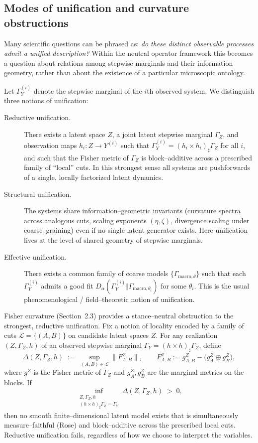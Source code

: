 \documentclass[11pt]{article}
\newcommand{\1}{\mathbf{1}}
\begin{document}
\subsection{Modes of unification and curvature obstructions}

Many scientific questions can be phrased as: \emph{do these distinct observable processes admit a unified description?} Within the neutral operator framework this becomes a question about relations among stepwise marginals and their information geometry, rather than about the existence of a particular microscopic ontology.

Let \(\Gamma_Y^{(i)}\) denote the stepwise marginal of the \(i\)th observed system. We distinguish three notions of unification:

\begin{description}
  \item[Reductive unification.]
    There exists a latent space \(Z\), a joint latent stepwise marginal \(\Gamma_Z\), and observation
    maps \(h_i : Z \to Y^{(i)}\) such that
    \(\Gamma_Y^{(i)} = (h_i \times h_i)_\sharp \Gamma_Z\) for all \(i\), and such that the Fisher
    metric of \(\Gamma_Z\) is block–additive across a prescribed family of ``local'' cuts. In this
    strongest sense all systems are pushforwards of a single, locally factorized latent dynamics.

  \item[Structural unification.]
    The systems share information–geometric invariants (curvature spectra across analogous cuts,
    scaling exponents \((\eta,\zeta)\), divergence scaling under coarse–graining) even if no single
    latent generator exists. Here unification lives at the level of shared geometry of stepwise
    marginals.

  \item[Effective unification.]
    There exists a common family of coarse models \(\{\Gamma_{\mathrm{macro},\theta}\}\) such that each
    \(\Gamma_Y^{(i)}\) admits a good fit \(D_\alpha(\Gamma_Y^{(i)} \Vert
    \Gamma_{\mathrm{macro},\theta_i})\) for some \(\theta_i\). This is the usual phenomenological /
    field–theoretic notion of unification.
\end{description}

Fisher curvature (Section~2.3) provides a stance–neutral obstruction to the strongest, reductive unification. Fix a notion of locality encoded by a family of cuts
\(\mathcal{L} = \{(A,B)\}\) on candidate latent spaces \(Z\). For any realization
\((Z,\Gamma_Z,h)\) of an observed stepwise marginal \(\Gamma_Y = (h \times h)_\sharp \Gamma_Z\), define
\[
  \Delta(Z,\Gamma_Z,h)
  \;:=\;
  \sup_{(A,B) \in \mathcal{L}} \bigl\|F^Z_{A,B}\bigr\|,
  \qquad
  F^Z_{A,B} := g^Z_{A,B} - \bigl(g^Z_A \oplus g^Z_B\bigr),
\]
where \(g^Z\) is the Fisher metric of \(\Gamma_Z\) and \(g^Z_A, g^Z_B\) are the marginal metrics on the blocks. If
\[
  \inf_{\substack{Z,\Gamma_Z,h\\(h \times h)_\sharp \Gamma_Z = \Gamma_Y}}
  \Delta(Z,\Gamma_Z,h) \;>\; 0,
\]
then no smooth finite–dimensional latent model exists that is simultaneously measure–faithful (Rose) and block–additive across the prescribed local cuts. Reductive unification fails, regardless of how we choose to interpret the variables.
\end{document}
